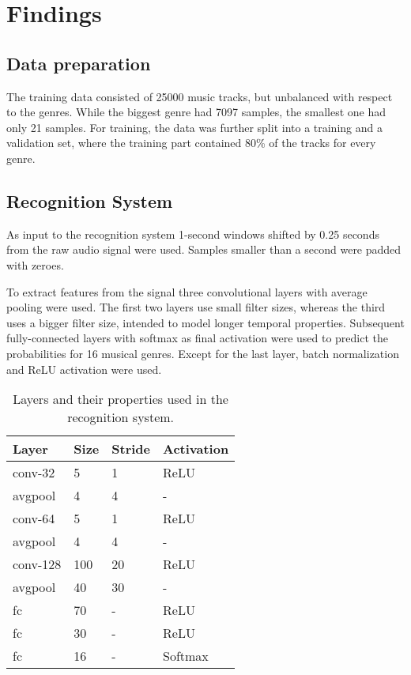 \documentclass[11pt, twocolumn]{article}
\begin{document}
\section{Findings}

\subsection{Data preparation}
The training data consisted of 25000 music tracks, but unbalanced with respect to the genres. While the biggest genre had 7097 samples, the smallest one had only 21 samples. For training, the data was further split into a training and a validation set, where the training part contained 80\% of the tracks for every genre.

\subsection{Recognition System}
As input to the recognition system 1-second windows shifted by 0.25 seconds from the raw audio signal were used. Samples smaller than a second were padded with zeroes.

To extract features from the signal three convolutional layers with average pooling were used. The first two layers use small filter sizes, whereas the third uses a bigger filter size, intended to model longer temporal properties. Subsequent fully-connected layers with softmax as final activation were used to predict the probabilities for 16 musical genres. Except for the last layer, batch normalization and ReLU activation were used.

\begin{table}[h]
\centering
		\begin{tabular}{|l|l|l|l|}			
			\hline
			Layer & Size & Stride & Activation  \\
			\hline\hline
			conv-32 & 5 & 1 & ReLU \\
			avgpool & 4 & 4 & - \\
			conv-64 & 5 & 1 & ReLU \\
			avgpool & 4 & 4 & - \\
			conv-128 & 100 & 20 & ReLU \\
			avgpool & 40 & 30 & - \\
			fc & 70 & - & ReLU \\
			fc & 30 & - & ReLU \\
			fc & 16 & - & Softmax \\
			\hline
		\end{tabular}
		\caption{Layers and their properties used in the recognition system.}\label{table-6}	
\end{table}
\end{document}
